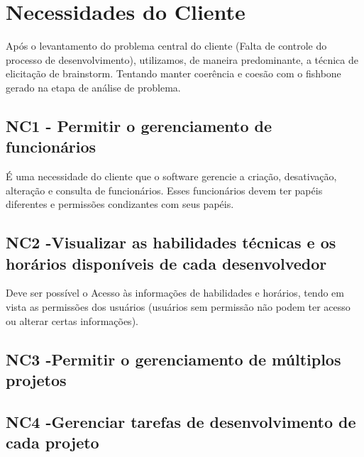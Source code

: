 \chapter{Necessidades do Cliente}
\label{sec:nc}

Após o levantamento do problema central do cliente (Falta de controle do processo de desenvolvimento), utilizamos, de maneira predominante, a técnica de elicitação de brainstorm. Tentando manter coerência e coesão com o fishbone gerado na etapa de análise de problema.

\section{NC1 - Permitir o gerenciamento de funcionários}

É uma necessidade do cliente que o software gerencie a criação, desativação, alteração e consulta de funcionários. Esses funcionários devem ter papéis diferentes e permissões condizantes com seus papéis. 

\section{NC2 -Visualizar as habilidades técnicas e os horários disponíveis de cada desenvolvedor}

Deve ser possível o Acesso às informações de habilidades e horários, tendo em vista as permissões dos usuários (usuários sem permissão não podem ter acesso ou alterar certas informações). 

\section{NC3 -Permitir o gerenciamento de múltiplos projetos}

\section{NC4 -Gerenciar tarefas de desenvolvimento de cada projeto}
